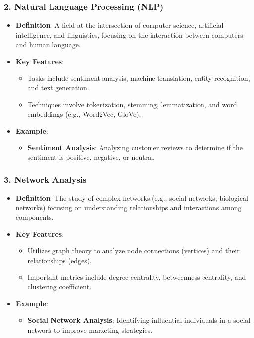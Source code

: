 \documentclass{beamer}
\begin{document}
\begin{frame}[fragile]
    \frametitle{2. Natural Language Processing (NLP)}
    \begin{itemize}
        \item \textbf{Definition}: A field at the intersection of computer science, artificial intelligence, and linguistics, focusing on the interaction between computers and human language.
        \item \textbf{Key Features}:
            \begin{itemize}
                \item Tasks include sentiment analysis, machine translation, entity recognition, and text generation.
                \item Techniques involve tokenization, stemming, lemmatization, and word embeddings (e.g., Word2Vec, GloVe).
            \end{itemize}
        \item \textbf{Example}:
            \begin{itemize}
                \item \textbf{Sentiment Analysis}: Analyzing customer reviews to determine if the sentiment is positive, negative, or neutral.
            \end{itemize}
    \end{itemize}
\end{frame}

\begin{frame}[fragile]
    \frametitle{3. Network Analysis}
    \begin{itemize}
        \item \textbf{Definition}: The study of complex networks (e.g., social networks, biological networks) focusing on understanding relationships and interactions among components.
        \item \textbf{Key Features}:
            \begin{itemize}
                \item Utilizes graph theory to analyze node connections (vertices) and their relationships (edges).
                \item Important metrics include degree centrality, betweenness centrality, and clustering coefficient.
            \end{itemize}
        \item \textbf{Example}:
            \begin{itemize}
                \item \textbf{Social Network Analysis}: Identifying influential individuals in a social network to improve marketing strategies.
            \end{itemize}
    \end{itemize}
\end{frame}
\end{document}
